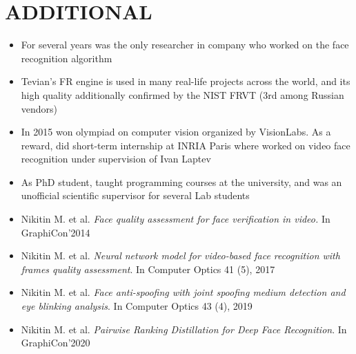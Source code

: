 \documentclass[11pt,a4paper,roman]{moderncv}        %
\makeatletter
\newcommand*{\customcvproject}[4][.25em]{
  \begin{tabular}{@{}l} 
    {\bfseries #2}
  \end{tabular}
  \hfill%
  \begin{tabular}{l@{}}
     {\itshape #3}
  \end{tabular}
  \ifx&#4&%
  \else{\\%
    \begin{minipage}{\maincolumnwidth}%
      \small#4%
    \end{minipage}}\fi%
  \par\addvspace{#1}}
\makeatother
\begin{document}
{{{{%

\section{ADDITIONAL}
\begin{minipage}{\maincolumnwidth}%
	\small{
    	\begin{itemize}
    	  \item For several years was the only researcher in company who worked on the face recognition algorithm
    	  \item Tevian's FR engine is used in many real-life projects across the world, and its high quality additionally confirmed by the NIST FRVT (3rd among Russian vendors)
    	  \item In 2015 won olympiad on computer vision organized by VisionLabs. As a reward, did short-term internship at INRIA Paris where worked on video face recognition under supervision of Ivan Laptev
    	  \item As PhD student, taught programming courses at the university, and was an unofficial scientific supervisor for several Lab students
		\end{itemize}}%
\end{minipage}%
      
}
\renewcommand{\refname}{PUBLICATIONS}
\nocite{*}


\begin{itemize}
	\item Nikitin M. et al. \textit{Face quality assessment for face verification in video.} In GraphiCon'2014
	\item Nikitin M. et al. \textit{Neural network model for video-based face recognition with frames quality assessment}. In Computer Optics 41 (5), 2017
	\item Nikitin M. et al. \textit{Face anti-spoofing with joint spoofing medium detection and eye blinking analysis}. In Computer Optics 43 (4), 2019
	\item Nikitin M. et al. \textit{Pairwise Ranking Distillation for Deep Face Recognition}. In GraphiCon'2020
\end{itemize}

}}}
\end{document}
